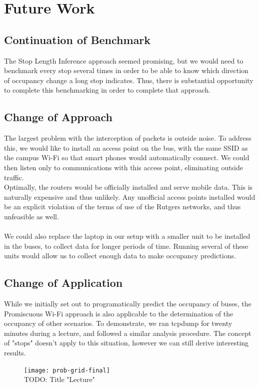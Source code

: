 \documentclass[letterpaper,abstract=on,titlepage=false]{scrreprt}
\begin{document}
\section*{Future Work}
\subsection*{Continuation of Benchmark}
	The Stop Length Inference approach seemed promising, but we would need to benchmark every stop several times in order to be able to know which direction of occupancy change a long stop indicates. Thus, there is substantial opportunity to complete this benchmarking in order to complete that approach.
\subsection*{Change of Approach}
	The largest problem with the interception of packets is outside noise.
	To address this, we would like to install an access point on the bus, with the same SSID as the campus Wi-Fi so that smart phones would automatically connect.
	We could then listen only to communications with this access point, eliminating outside traffic.
	\\
	Optimally, the routers would be officially installed and serve mobile data. 
	This is naturally expensive and thus unlikely. 
	Any unofficial access points installed would be an explicit violation of the terms of use of the Rutgers networks, and thus unfeasible as well.
	\\\\
	We could also replace the laptop in our setup with a smaller unit to be installed in the buses, to collect data for longer periods of time. 
	Running several of these units would allow us to collect enough data to make occupancy predictions.

\subsection*{Change of Application}
	While we initially set out to programatically predict the occupancy of buses, the Promiscuous Wi-Fi approach is also applicable to the determination of the occupancy of other scenarios.
	To demonstrate, we ran tcpdump for twenty minutes during a lecture, and followed a similar analysis procedure.
	The concept of "stops" doesn't apply to this situation, however we can still derive interesting results.

	\begin{figure}[H]
		\texttt{[image: prob-grid-final]}
		\centering
		\\TODO: Title "Lecture"
	\end{figure}
\end{document}
